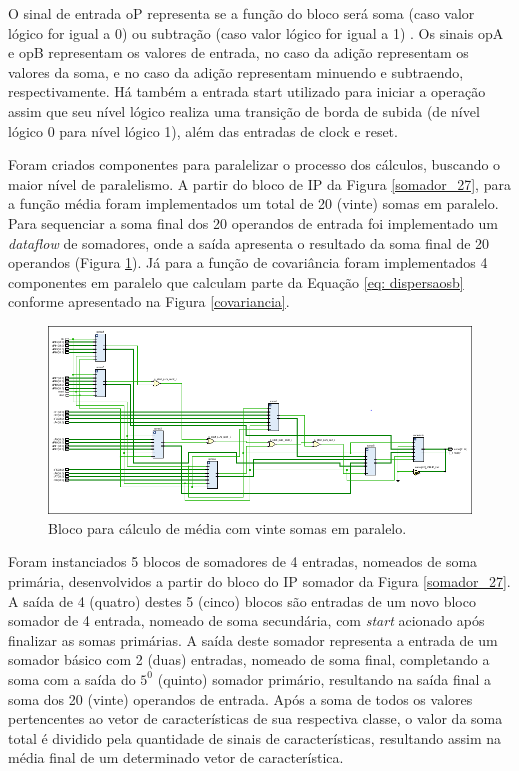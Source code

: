 O sinal de entrada oP representa se a função do bloco será soma (caso valor lógico for igual a 0) ou subtração (caso valor lógico for igual a 1) \cite{munoz2010tradeoff}. Os sinais opA e opB representam os valores de entrada, no caso da adição representam os valores da soma, e no caso da adição representam minuendo e subtraendo, respectivamente. Há também a entrada start utilizado para iniciar a operação assim que seu nível lógico realiza uma transição de borda de subida (de nível lógico 0 para nível lógico 1), além das entradas de clock e reset. 

Foram criados componentes para paralelizar o processo dos cálculos, buscando o maior nível de paralelismo. A partir do bloco de IP da Figura \ref{somador_27}, para a função média foram implementados um total de 20 (vinte) somas em paralelo. Para sequenciar a soma final dos 20 operandos de entrada foi implementado um \textit{dataflow} de somadores, onde a saída apresenta o resultado da soma final de 20 operandos (Figura \ref{somador}). Já para a função de covariância foram implementados 4 componentes em paralelo que calculam parte da Equação \ref{eq: dispersaosb} conforme apresentado na Figura \ref{covariancia}.

\begin{figure}[h]
	\centering
	\includegraphics[keepaspectratio=true,scale=0.55]{figuras/rtl_media.png}
	\caption{Bloco para cálculo de média com vinte somas em paralelo.}
	\label{somador}
\end{figure}

Foram instanciados 5 blocos de somadores de 4 entradas, nomeados de soma primária, desenvolvidos a partir do bloco do IP somador da Figura \ref{somador_27}. A saída de 4 (quatro) destes 5 (cinco) blocos são entradas de um novo bloco somador de 4 entrada, nomeado de soma secundária, com \textit{start} acionado após finalizar as somas primárias. A saída deste somador representa a entrada de um somador básico com 2 (duas) entradas, nomeado de soma final, completando a soma com a saída do $5^0$ (quinto) somador primário, resultando na saída final a soma dos 20 (vinte) operandos de entrada.
Após a soma de todos os valores pertencentes ao vetor de características de sua respectiva classe, o valor da soma total é dividido pela quantidade de sinais de características, resultando assim na média final de um determinado vetor de característica. 


